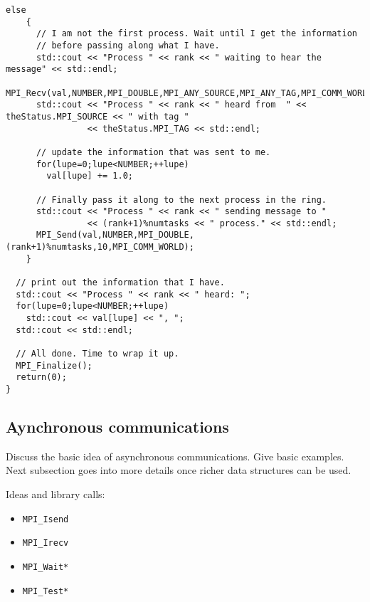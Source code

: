 \begin{lstlisting}[caption={Example of blocking communication.},
                   basicstyle=\scriptsize,
                   label=listing:blockingCommunication]
  else
    {
      // I am not the first process. Wait until I get the information
      // before passing along what I have.
      std::cout << "Process " << rank << " waiting to hear the message" << std::endl;
      MPI_Recv(val,NUMBER,MPI_DOUBLE,MPI_ANY_SOURCE,MPI_ANY_TAG,MPI_COMM_WORLD,&theStatus);
      std::cout << "Process " << rank << " heard from  " << theStatus.MPI_SOURCE << " with tag " 
                << theStatus.MPI_TAG << std::endl;

      // update the information that was sent to me.
      for(lupe=0;lupe<NUMBER;++lupe)
        val[lupe] += 1.0;

      // Finally pass it along to the next process in the ring.
      std::cout << "Process " << rank << " sending message to " 
                << (rank+1)%numtasks << " process." << std::endl;
      MPI_Send(val,NUMBER,MPI_DOUBLE,(rank+1)%numtasks,10,MPI_COMM_WORLD);
    }

  // print out the information that I have.
  std::cout << "Process " << rank << " heard: ";
  for(lupe=0;lupe<NUMBER;++lupe)
    std::cout << val[lupe] << ", ";
  std::cout << std::endl;

  // All done. Time to wrap it up.
  MPI_Finalize();
  return(0);
}
\end{lstlisting}

\subsection{Aynchronous communications}

Discuss the basic idea of asynchronous communications. Give basic
examples. Next subsection goes into more details once richer data
structures can be used.

Ideas and library calls: \\
\begin{itemize}
\item \texttt{MPI\_Isend}
\item \texttt{MPI\_Irecv}
\item \texttt{MPI\_Wait*}
\item \texttt{MPI\_Test*}
\end{itemize}

